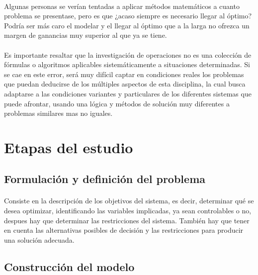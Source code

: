 \documentclass[12pt, a4paper,spanish]{article}
\begin{document}
		\paragraph{}
		Algunas personas se verían tentadas a aplicar métodos matemáticos a cuanto problema se presentase, pero es que ¿acaso siempre es necesario llegar al óptimo? Podría ser más caro el modelar y el llegar al óptimo que a la larga no ofrezca un margen de ganancias muy superior al que ya se tiene.\cite{wikipedia_IO}

		\paragraph{}
		Es importante resaltar que la investigación de operaciones no es una colección de fórmulas o algoritmos aplicables sistemáticamente a situaciones determinadas. Si se cae en este error, será muy difícil captar en condiciones reales los problemas que puedan deducirse de los múltiples aspectos de esta disciplina, la cual busca adaptarse a las condiciones variantes y particulares de los diferentes sistemas que puede afrontar, usando una lógica y métodos de solución muy diferentes a problemas similares mas no iguales. \cite{wikipedia_IO}

	\section{Etapas del estudio}

		\subsection{Formulación y definición del problema}

			\paragraph{}
			Consiste en la descripción de los objetivos del sistema, es decir, determinar qué se desea optimizar, identificando las variables implicadas, ya sean controlables o no, despues hay que  determinar las restricciones del sistema. También hay que tener en cuenta las alternativas posibles de decisión y las restricciones para producir una solución adecuada. \cite{invdeop_IO}

		\subsection{Construcción del modelo}
\end{document}
